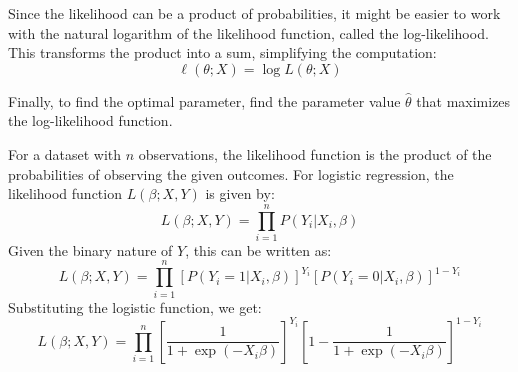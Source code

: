 Since the likelihood can be a product of probabilities, it might be easier to work with the natural logarithm of the likelihood function, called the log-likelihood. This transforms the product into a sum, simplifying the computation:
\[
\ell(\theta; X) = \log L(\theta; X)
\]

Finally, to find the optimal parameter, find the parameter value \(\hat{\theta}\) that maximizes the log-likelihood function.

For a dataset with \( n \) observations, the likelihood function is the product of the probabilities of observing the given outcomes. For logistic regression, the likelihood function \( L(\beta; X, Y) \) is given by:
\[
L(\beta; X, Y) = \prod_{i=1}^{n} P(Y_i | X_i, \beta)
\]
Given the binary nature of \( Y \), this can be written as:
\[
L(\beta; X, Y) = \prod_{i=1}^{n} [P(Y_i = 1 | X_i, \beta)]^{Y_i} [P(Y_i = 0 | X_i, \beta)]^{1 - Y_i}
\]
Substituting the logistic function, we get:
\[
L(\beta; X, Y) = \prod_{i=1}^{n} \left[\frac{1}{1 + \exp(-X_i \beta)}\right]^{Y_i} \left[1 - \frac{1}{1 + \exp(-X_i \beta)}\right]^{1 - Y_i}
\]





